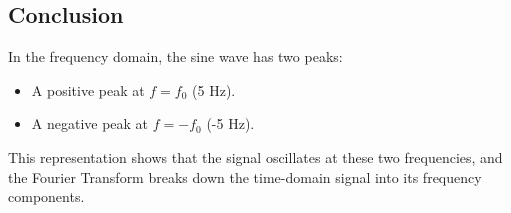 \documentclass[letterpaper, 11pt]{article} %
\begin{document}
\subsection*{Conclusion}
In the frequency domain, the sine wave has two peaks:
\begin{itemize}[label=\textbullet, leftmargin=*]
    \item A positive peak at \( f = f_0 \) (5 Hz).
    \item A negative peak at \( f = -f_0 \) (-5 Hz).
\end{itemize}

This representation shows that the signal oscillates at these two frequencies, and the Fourier Transform breaks down the time-domain signal into its frequency components.
\end{document}
